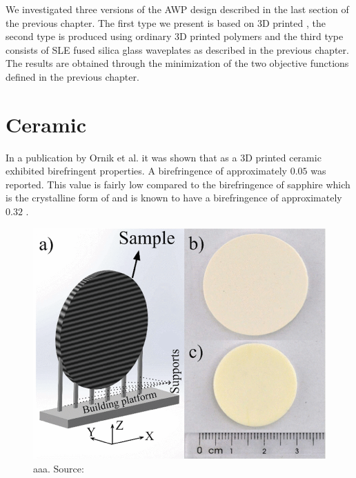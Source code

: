 We investigated three versions of the AWP design described in the last section of the previous chapter. The first type we present is based on 3D printed , the second type is produced using ordinary 3D printed polymers and the third type consists of SLE fused silica glass waveplates as described in the previous chapter. The results are obtained through the minimization of the two objective functions defined in the previous chapter.


\section{Ceramic}
In a publication by Ornik et al. it was shown that  as a 3D printed ceramic exhibited birefringent properties. A birefringence of approximately $0.05$ was reported.  This value is fairly low compared to the birefringence of sapphire which is the crystalline form of  and is known to have a birefringence of approximately $0.32$ \cite{Ornik2021}.  

\begin{figure}[h]
    \centering
    \includegraphics[scale=0.4]{images/5_chapter05/ornik1abc-3047514-large.png}
    \caption{aaa. Source: \cite{Ornik2021}}
    \label{fig:my_label}
\end{figure}

